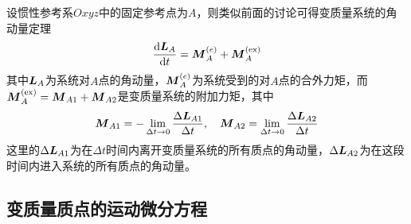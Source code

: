 设惯性参考系$Oxyz$中的固定参考点为$A$，则类似前面的讨论可得变质量系统的角动量定理
\begin{equation}
	\dfrac{\mathrm{d} \boldsymbol{L}_A}{\mathrm{d} t} = \boldsymbol{M}_A^{(e)} + \boldsymbol{M}_A^{(\text{ex})}
\end{equation}
其中$\boldsymbol{L}_A$为系统对$A$点的角动量，$\boldsymbol{M}_A^{(e)}$为系统受到的对$A$点的合外力矩，而$\boldsymbol{M}_A^{(\text{ex})} = \boldsymbol{M}_{A1} + \boldsymbol{M}_{A2}$是变质量系统的附加力矩，其中
\begin{equation}
	\boldsymbol{M}_{A1} = -\lim_{\Delta t\to 0} \frac{\Delta \boldsymbol{L}_{A1}}{\Delta t},\quad \boldsymbol{M}_{A2} =  \lim_{\Delta t\to 0} \frac{\Delta \boldsymbol{L}_{A2}}{\Delta t}
\end{equation}
这里的$\Delta \boldsymbol{L}_{A1}$为在$\Delta t$时间内离开变质量系统的所有质点的角动量，$\Delta \boldsymbol{L}_{A2}$为在这段时间内进入系统的所有质点的角动量。


\subsection{变质量质点的运动微分方程}


